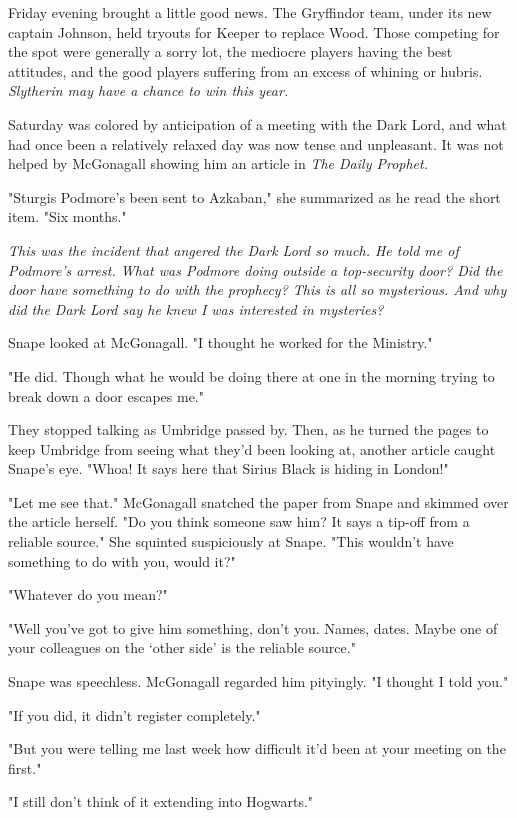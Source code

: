 \documentclass[a4paper,11pt]{article}
\begin{document}
Friday evening brought a little good news. The Gryffindor team, under its new captain Johnson, held tryouts for Keeper to replace Wood. Those competing for the spot were generally a sorry lot, the mediocre players having the best attitudes, and the good players suffering from an excess of whining or hubris. \emph{Slytherin may have a chance to win this year.}

Saturday was colored by anticipation of a meeting with the Dark Lord, and what had once been a relatively relaxed day was now tense and unpleasant. It was not helped by McGonagall showing him an article in \emph{The Daily Prophet.}

"Sturgis Podmore's been sent to Azkaban," she summarized as he read the short item. "Six months."

\emph{This was the incident that angered the Dark Lord so much. He told me of Podmore's arrest. What was Podmore doing outside a top-security door? Did the door have something to do with the prophecy? This is all so mysterious. And why did the Dark Lord say he knew I was interested in mysteries?}

Snape looked at McGonagall. "I thought he worked for the Ministry."

"He did. Though what he would be doing there at one in the morning trying to break down a door escapes me."

They stopped talking as Umbridge passed by. Then, as he turned the pages to keep Umbridge from seeing what they'd been looking at, another article caught Snape's eye. "Whoa! It says here that Sirius Black is hiding in London!"

"Let me see that." McGonagall snatched the paper from Snape and skimmed over the article herself. "Do you think someone saw him? It says a tip-off from a reliable source." She squinted suspiciously at Snape. "This wouldn't have something to do with you, would it?"

"Whatever do you mean?"

"Well you've got to give him something, don't you. Names, dates. Maybe one of your colleagues on the `other side' is the reliable source."

Snape was speechless. McGonagall regarded him pityingly. "I thought I told you."

"If you did, it didn't register completely."

"But you were telling me last week how difficult it'd been at your meeting on the first."

"I still don't think of it extending into Hogwarts."
\end{document}
